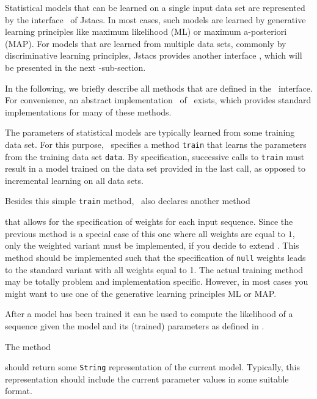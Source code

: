 Statistical models that can be learned on a single input data set are represented by the interface \TrainSM~of Jstacs. In most cases, such models are learned by generative learning principles like maximum likelihood (ML) or maximum a-posteriori (MAP). For models that are learned from multiple data sets, commonly by discriminative learning principles, Jstacs provides another interface \DiffSM, which will be presented in the next -sub-section.

In the following, we briefly describe all methods that are defined in the \TrainSM~interface. For convenience, an abstract implementation \AbstractTrainSM~of \TrainSM~exists, which provides standard implementations for many of these methods.

\renewcommand{\codefile}{../../de/jstacs/sequenceScores/statisticalModels/trainable/TrainableStatisticalModel.java}
\setcounter{off}{58}

The parameters of statistical models are typically learned from some training data set. For this purpose, \TrainSM~specifies a method \lstinline+train+
that learns the parameters from the training data set \lstinline+data+. By specification, successive calls to \lstinline+train+ must result in a model trained on the data set provided in the last call, as opposed to incremental learning on all data sets.

Besides this simple \lstinline+train+ method, \TrainSM~also declares another method
\addtocounter{off}{27}
that allows for the specification of weights for each input sequence. Since the previous method is a special case of this one where all weights are equal to $1$, only the weighted variant must be implemented, if you decide to extend \AbstractTrainSM. This method should be implemented such that the specification of \lstinline+null+ weights leads to the standard variant with all weights equal to 1. The actual training method may be totally problem and implementation specific. However, in most cases you might want to use one of the generative learning principles ML or MAP.

After a model has been trained it can be used to compute the likelihood of a sequence given the model and its (trained) parameters as defined in \StatMod.

The method
\addtocounter{off}{7}
should return some \lstinline+String+ representation of the current model. Typically, this representation should include the current parameter values in some suitable format.

\renewcommand{\codefile}{../codeExamples/NewCodeExampleTest.java}

